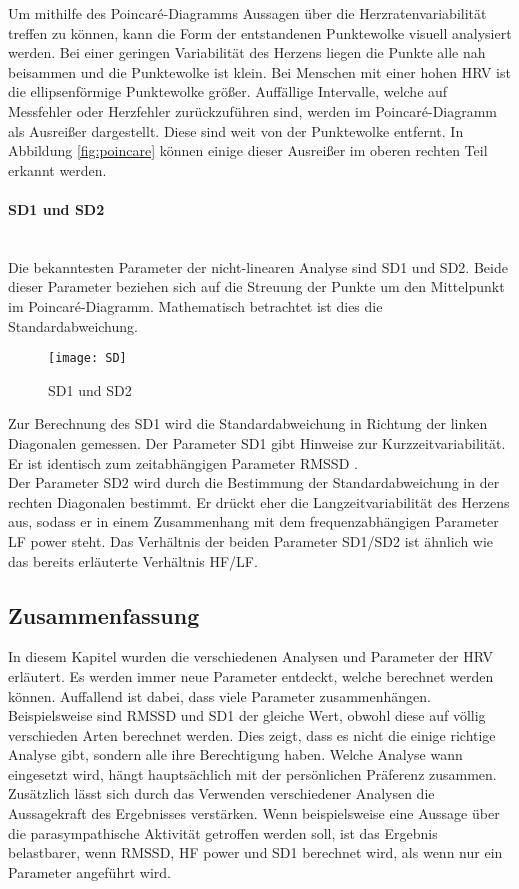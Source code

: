 Um mithilfe des Poincaré-Diagramms Aussagen über die Herzratenvariabilität treffen zu können, kann die Form der entstandenen Punktewolke visuell analysiert werden. Bei einer geringen Variabilität des Herzens liegen die Punkte alle nah beisammen und die Punktewolke ist klein. Bei Menschen mit einer hohen HRV ist die ellipsenförmige Punktewolke größer. Auffällige Intervalle, welche auf Messfehler oder Herzfehler zurückzuführen sind, werden im Poincaré-Diagramm als Ausreißer dargestellt. Diese sind weit von der Punktewolke entfernt. In Abbildung \ref{fig:poincare} können einige dieser Ausreißer im oberen rechten Teil erkannt werden.

\paragraph{SD1 und SD2}\mbox{} \\
Die bekanntesten Parameter der nicht-linearen Analyse sind SD1 und SD2. Beide dieser Parameter beziehen sich auf die Streuung der Punkte um den Mittelpunkt im Poincaré-Diagramm. Mathematisch betrachtet ist dies die Standardabweichung.\cite{poincare}
\begin{figure}[H]
	\centering
	\texttt{[image: SD]}
	\caption{SD1 und SD2}
	\label{fig:SD}
	\cite{poincare}
\end{figure}

Zur Berechnung des SD1 wird die Standardabweichung in Richtung der linken Diagonalen gemessen. Der Parameter SD1 gibt Hinweise zur Kurzzeitvariabilität. Er ist identisch zum zeitabhängigen Parameter RMSSD \cite[S.6]{med}. \\

Der Parameter SD2 wird durch die Bestimmung der Standardabweichung in der rechten Diagonalen bestimmt. Er drückt eher die Langzeitvariabilität des Herzens aus, sodass er in einem Zusammenhang mit dem frequenzabhängigen Parameter LF power steht. Das Verhältnis der beiden Parameter SD1/SD2 ist ähnlich wie das bereits erläuterte Verhältnis HF/LF. \cite[S.7]{med} 

\subsection{Zusammenfassung}

In diesem Kapitel wurden die verschiedenen Analysen und Parameter der HRV erläutert. Es werden immer neue Parameter entdeckt, welche berechnet werden können. Auffallend ist dabei, dass viele Parameter zusammenhängen. Beispielsweise sind RMSSD und SD1 der gleiche Wert, obwohl diese auf völlig verschieden Arten berechnet werden. Dies zeigt, dass es nicht die einige richtige Analyse gibt, sondern alle ihre Berechtigung haben. Welche Analyse wann eingesetzt wird, hängt hauptsächlich mit der persönlichen Präferenz zusammen.\\
Zusätzlich lässt sich durch das Verwenden verschiedener Analysen die Aussagekraft des Ergebnisses verstärken. Wenn beispielsweise eine Aussage über die parasympathische Aktivität getroffen werden soll, ist das Ergebnis belastbarer, wenn RMSSD, HF power und SD1 berechnet wird, als wenn nur ein Parameter angeführt wird. \\

